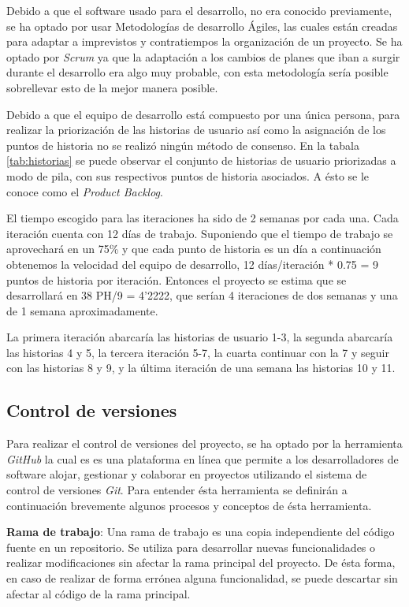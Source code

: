 Debido a que el software usado para el desarrollo, no era conocido previamente, se ha optado por usar Metodologías de desarrollo Ágiles, las cuales están creadas para adaptar a imprevistos y contratiempos la organización de un proyecto. Se ha optado por \textit{Scrum} ya que la adaptación a los cambios de planes que iban a surgir durante el desarrollo era algo muy probable, con esta metodología sería posible sobrellevar esto de la mejor manera posible.

Debido a que el equipo de desarrollo está compuesto por una única persona, para realizar la priorización de las historias de usuario así como la asignación de los puntos de historia no se realizó ningún método de consenso. En la tabala \ref{tab:historias} se puede observar el conjunto de historias de usuario priorizadas a modo de pila, con sus respectivos puntos de historia asociados. A ésto se le conoce como el \textit{Product Backlog}.

El tiempo escogido para las iteraciones ha sido de 2 semanas por cada una. Cada iteración cuenta con 12 días de trabajo. Suponiendo que el tiempo de trabajo se aprovechará en un 75\% y que cada punto de historia es un día a continuación obtenemos la velocidad del equipo de desarrollo, 12 días/iteración * 0.75 =  9 puntos de historia por iteración. Entonces el proyecto se estima que se desarrollará en 38 PH/9 = 4'2222, que serían 4 iteraciones de dos semanas y una de 1 semana aproximadamente.

La primera iteración abarcaría las historias de usuario 1-3, la segunda abarcaría las historias 4 y 5, la tercera iteración 5-7, la cuarta continuar con la 7 y seguir con las historias 8 y 9, y la última iteración de una semana las historias 10 y 11.

\subsection{Control de versiones}

Para realizar el control de versiones del proyecto, se ha optado por la herramienta \textit{GitHub} \cite{Github} la cual es es una plataforma en línea que permite a los desarrolladores de software alojar, gestionar y colaborar en proyectos utilizando el sistema de control de versiones \textit{Git}. Para entender ésta herramienta se definirán a continuación brevemente algunos procesos y conceptos de ésta herramienta.

\textbf{Rama de trabajo}: Una rama de trabajo es una copia independiente del código fuente en un repositorio. Se utiliza para desarrollar nuevas funcionalidades o realizar modificaciones sin afectar la rama principal del proyecto. De ésta forma, en caso de realizar de forma errónea alguna funcionalidad, se puede descartar sin afectar al código de la rama principal.


